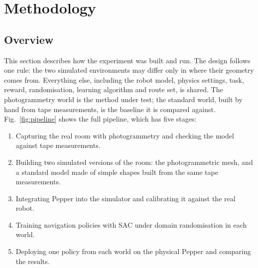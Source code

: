\section{Methodology}\label{sec:methodology}

\subsection{Overview}
This section describes how the experiment was built and run. The design follows one rule: the
two simulated environments may differ only in where their geometry comes from. Everything else,
including the robot model, physics settings, task, reward, randomisation, learning algorithm and
route set, is shared. The photogrammetry world is the method under test; the standard world,
built by hand from tape measurements, is the baseline it is compared against.
Fig.~\ref{fig:pipeline} shows the full pipeline, which has five stages:
\begin{enumerate}
\item Capturing the real room with photogrammetry and checking the model against tape measurements.
\item Building two simulated versions of the room: the photogrammetric mesh, and a standard model
made of simple shapes built from the same tape measurements.
\item Integrating Pepper into the simulator and calibrating it against the real robot.
\item Training navigation policies with SAC under domain randomisation in each world.
\item Deploying one policy from each world on the physical Pepper and comparing the results.
\end{enumerate}

